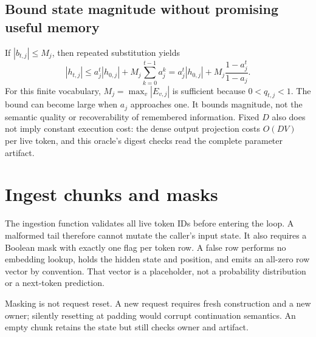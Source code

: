 \subsection{Bound state magnitude without promising useful memory}
If $|b_{t,j}|\le M_j$, then repeated substitution yields
\[
 |h_{t,j}|\le a_j^t|h_{0,j}|+
 M_j\sum_{k=0}^{t-1}a_j^k
 =a_j^t|h_{0,j}|+M_j\frac{1-a_j^t}{1-a_j}.
\]
For this finite vocabulary, $M_j=\max_v|E_{v,j}|$ is sufficient because
$0<q_{t,j}<1$. The bound can become large when $a_j$ approaches one.
It bounds magnitude, not the semantic quality or recoverability of remembered
information. Fixed $D$ also does not imply constant execution cost: the dense
output projection costs $O(DV)$ per live token, and this oracle's digest checks
read the complete parameter artifact.

\section{Ingest chunks and masks}
The ingestion function validates all live token IDs before entering the loop.
A malformed tail therefore cannot mutate the caller's input state. It also
requires a Boolean mask with exactly one flag per token row.
A false row performs no embedding lookup, holds the hidden state and position,
and emits an all-zero row vector by convention. That vector is a placeholder,
not a probability distribution or a next-token prediction.

Masking is not request reset. A new request requires fresh construction and a
new owner; silently resetting at padding would corrupt continuation semantics.
An empty chunk retains the state but still checks owner and artifact.

